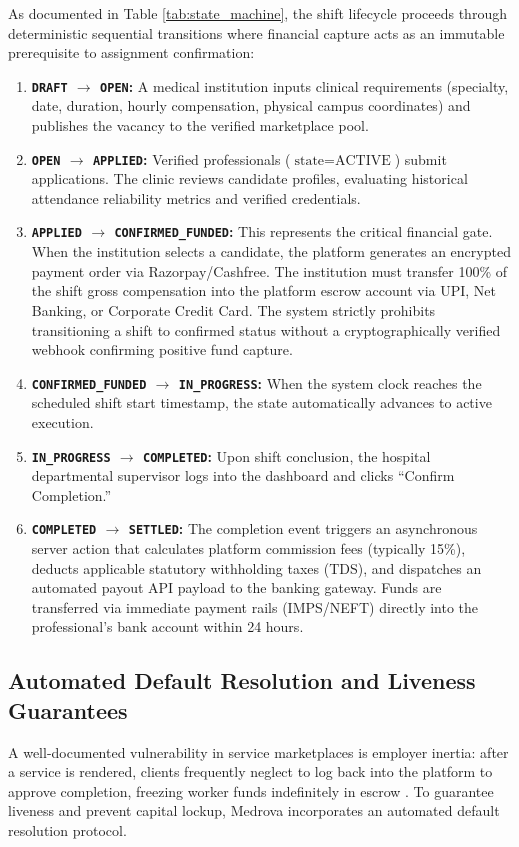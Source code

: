 \documentclass[conference]{IEEEtran}
\begin{document}
As documented in Table \ref{tab:state_machine}, the shift lifecycle proceeds through deterministic sequential transitions where financial capture acts as an immutable prerequisite to assignment confirmation:
\begin{enumerate}
    \item \textbf{\texttt{DRAFT} $\rightarrow$ \texttt{OPEN}:} A medical institution inputs clinical requirements (specialty, date, duration, hourly compensation, physical campus coordinates) and publishes the vacancy to the verified marketplace pool.
    \item \textbf{\texttt{OPEN} $\rightarrow$ \texttt{APPLIED}:} Verified professionals ($\text{state} = \text{ACTIVE}$) submit applications. The clinic reviews candidate profiles, evaluating historical attendance reliability metrics and verified credentials.
    \item \textbf{\texttt{APPLIED} $\rightarrow$ \texttt{CONFIRMED\_FUNDED}:} This represents the critical financial gate. When the institution selects a candidate, the platform generates an encrypted payment order via Razorpay/Cashfree. The institution must transfer 100\% of the shift gross compensation into the platform escrow account via UPI, Net Banking, or Corporate Credit Card. The system strictly prohibits transitioning a shift to confirmed status without a cryptographically verified webhook confirming positive fund capture.
    \item \textbf{\texttt{CONFIRMED\_FUNDED} $\rightarrow$ \texttt{IN\_PROGRESS}:} When the system clock reaches the scheduled shift start timestamp, the state automatically advances to active execution.
    \item \textbf{\texttt{IN\_PROGRESS} $\rightarrow$ \texttt{COMPLETED}:} Upon shift conclusion, the hospital departmental supervisor logs into the dashboard and clicks ``Confirm Completion.'' 
    \item \textbf{\texttt{COMPLETED} $\rightarrow$ \texttt{SETTLED}:} The completion event triggers an asynchronous server action that calculates platform commission fees (typically 15\%), deducts applicable statutory withholding taxes (TDS), and dispatches an automated payout API payload to the banking gateway. Funds are transferred via immediate payment rails (IMPS/NEFT) directly into the professional's bank account within 24 hours.
\end{enumerate}

\subsection{Automated Default Resolution and Liveness Guarantees}
A well-documented vulnerability in service marketplaces is employer inertia: after a service is rendered, clients frequently neglect to log back into the platform to approve completion, freezing worker funds indefinitely in escrow \cite{edelman2016disintermediation}. To guarantee liveness and prevent capital lockup, Medrova incorporates an automated default resolution protocol.
\end{document}
